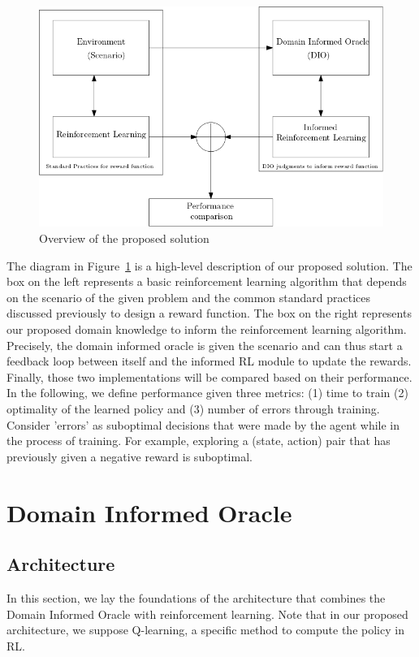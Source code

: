 \documentclass[a4paper,11pt]{article}
\begin{document}
\begin{figure}[H]
  \centering
  \includegraphics[scale=0.5]{overview.png}
  \caption{Overview of the proposed solution}
  \label{fig:overview}
\end{figure}

The diagram in Figure~\ref{fig:overview} is a high-level description of our proposed solution. 
%
The box on the left represents a basic reinforcement learning algorithm that depends on the scenario of the given problem and 
the common standard practices discussed previously to design a reward function. 
%
The box on the right represents our proposed domain knowledge to inform the reinforcement learning algorithm. 
Precisely, the domain informed oracle is given the scenario and can thus start a feedback loop between itself and 
the informed RL module to update the rewards. 
%
Finally, those two implementations will be compared based on their performance. In the following, we define performance 
given three metrics: (1) time to train (2) optimality of the learned policy and (3) number of errors through training. 
Consider 'errors' as suboptimal decisions that were made by the agent while in the process of training. For example, exploring a (state, action) pair 
that has previously given a negative reward is suboptimal. 

\section{Domain Informed Oracle} 
\subsection{Architecture}
In this section, we lay the foundations of the architecture that combines the Domain Informed Oracle with 
reinforcement learning. Note that in our proposed architecture, we suppose Q-learning, a specific method to compute the policy in RL. 
\end{document}
